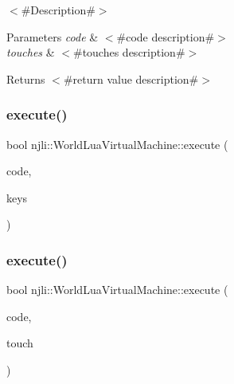 $<$\#\+Description\#$>$


\begin{DoxyParams}{Parameters}
{\em code} & $<$\#code description\#$>$ \\
\hline
{\em touches} & $<$\#touches description\#$>$ \\
\hline
\end{DoxyParams}
\begin{DoxyReturn}{Returns}
$<$\#return value description\#$>$ 
\end{DoxyReturn}
\mbox{\label{classnjli_1_1_world_lua_virtual_machine_afd80dd6a43e8f7579ee9cd91ab2dc5e2}} 
\subsubsection{\texorpdfstring{execute()}{execute()}\hspace{0.1cm}{\footnotesize\ttfamily [14/33]}}
{\footnotesize\ttfamily bool njli\+::\+World\+Lua\+Virtual\+Machine\+::execute (\begin{DoxyParamCaption}\item[{const char $\ast$}]{code,  }\item[{\mbox{\hyperlink{classnjli_1_1_device_key}{Device\+Key}} $\ast$$\ast$}]{keys }\end{DoxyParamCaption})}

\mbox{\label{classnjli_1_1_world_lua_virtual_machine_ab0a3f94a9fe51d41d8c8cef35c6295e5}} 
\subsubsection{\texorpdfstring{execute()}{execute()}\hspace{0.1cm}{\footnotesize\ttfamily [15/33]}}
{\footnotesize\ttfamily bool njli\+::\+World\+Lua\+Virtual\+Machine\+::execute (\begin{DoxyParamCaption}\item[{const char $\ast$}]{code,  }\item[{const \mbox{\hyperlink{classnjli_1_1_device_touch}{Device\+Touch}} \&}]{touch }\end{DoxyParamCaption})}

